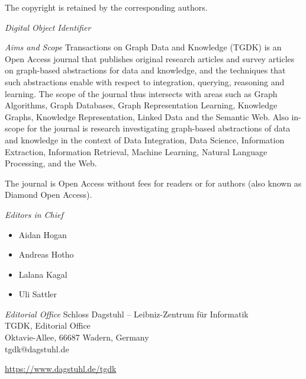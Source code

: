 \documentclass[a4paper,UKenglish]{tgdkmaster-v2021}
\begin{document}
\begin{publicationinfo}
The copyright is retained by the corresponding authors.

\vfill
\emph{Digital Object Identifier}\newline
\printForewordDOI

\newpage


\bigskip

\emph{Aims and Scope}\newline
Transactions on Graph Data and Knowledge (TGDK) is an Open Access journal that publishes original research articles and survey articles on graph-based abstractions for data and knowledge, and the techniques that such abstractions enable with respect to integration, querying, reasoning and learning. The scope of the journal thus intersects with areas such as Graph Algorithms, Graph Databases, Graph Representation Learning, Knowledge Graphs, Knowledge Representation, Linked Data and the Semantic Web. Also in-scope for the journal is research investigating graph-based abstractions of data and knowledge in the context of Data Integration, Data Science, Information Extraction, Information Retrieval, Machine Learning, Natural Language Processing, and the Web.

\medskip

The journal is Open Access without fees for readers or for authors (also known as Diamond Open Access).	

\bigskip

\emph{Editors in Chief}
\begin{itemize}
\item Aidan Hogan
\item Andreas Hotho
\item Lalana Kagal
\item Uli Sattler
\end{itemize}

\bigskip
\emph{Editorial Office}\newline
Schloss Dagstuhl -- Leibniz-Zentrum f\"ur Informatik\\
TGDK, Editorial Office\\
Oktavie-Allee, 66687 Wadern, Germany\\ 
tgdk@dagstuhl.de


\vfill

\url{https://www.dagstuhl.de/tgdk}
 
 \thispagestyle{empty}
 \onecolumn
\end{publicationinfo}
\end{document}
